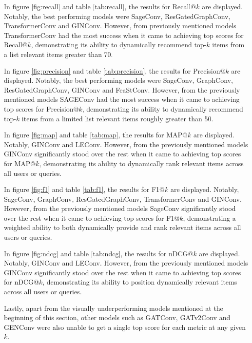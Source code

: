 \documentclass{scrartcl}
\begin{document}
In figure \ref{fig:recall} and table \ref{tab:recall}, the results for Recall@$k$ are displayed. Notably, the best performing models were SageConv, ResGatedGraphConv, TransformerConv and GINConv. However, from previously mentioned models TransformerConv had the most success when it came to achieving top scores for Recall@$k$, demonstrating its ability to dynamically recommend top-$k$ items from a list relevant items greater than 70.

In figure \ref{fig:precision} and table \ref{tab:precision}, the results for Precision@$k$ are displayed. Notably, the best performing models were SageConv, GraphConv, ResGatedGraphConv, GINConv and FeaStConv. However, from the previously mentioned models SAGEConv had the most success when it came to achieving top scores for Precision@$k$, demonstrating its ability to dynamically recommend top-$k$ items from a limited list relevant items roughly greater than 50.

In figure \ref{fig:map} and table \ref{tab:map}, the results for MAP@$k$ are displayed. Notably, GINConv and LEConv. However, from the previously mentioned models GINConv significantly stood over the rest when it came to achieving top scores for MAP@$k$, demonstrating its ability to dynamically rank relevant items across all users or queries.

In figure \ref{fig:f1} and table \ref{tab:f1}, the results for F1@$k$ are displayed. Notably, SageConv, GraphConv, ResGatedGraphConv, TransformerConv and GINConv. However, from the previously mentioned models SageConv significantly stood over the rest when it came to achieving top scores for F1@$k$, demonstrating a weighted ability to both dynamically provide and rank relevant items across all users or queries.

In figure \ref{fig:ndcg} and table \ref{tab:ndcg}, the results for nDCG@$k$ are displayed. Notably, GINConv and LEConv. However, from the previously mentioned models GINConv significantly stood over the rest when it came to achieving top scores for nDCG@$k$, demonstrating its ability to position dynamically relevant items across all users or queries.

Lastly, apart from the visually underperforming models mentioned at the beginning of this section, other models such as GATConv, GATv2Conv and GENConv were also unable to get a single top score for each metric at any given $k$.


\end{document}
